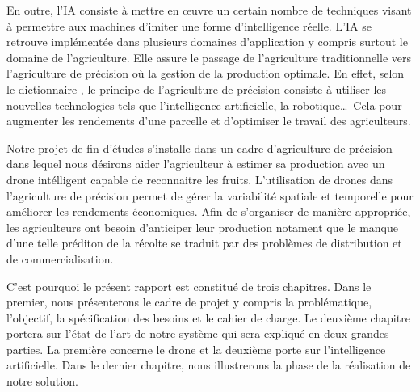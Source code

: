 En outre, l'IA consiste à mettre en œuvre un certain nombre de techniques visant à permettre aux machines d'imiter une forme d'intelligence réelle. L'IA se retrouve implémentée dans plusieurs domaines d'application\cite{netactions} y compris surtout le domaine de l'agriculture. Elle assure le passage de l'agriculture traditionnelle vers l'agriculture de précision où la gestion de la production optimale. En effet, selon le dictionnaire \cite{leshorizons}, le principe de l'agriculture de précision consiste à utiliser les nouvelles technologies tels que l'intelligence artificielle, la robotique\ldots\ Cela pour augmenter les rendements d'une parcelle et d'optimiser le travail des agriculteurs.

Notre projet de fin d'études s'installe dans un cadre d'agriculture de précision dans lequel nous désirons aider l'agriculteur à estimer sa production avec un drone intélligent capable de reconnaitre les fruits. L'utilisation de drones dans l'agriculture de précision permet de gérer la variabilité spatiale et temporelle pour améliorer les rendements économiques. Afin de s'organiser de manière appropriée, les agriculteurs ont besoin d'anticiper leur production notament que le manque d'une telle préditon de la récolte se traduit par des problèmes de distribution et de commercialisation.

C'est pourquoi le présent rapport est constitué de trois chapitres. Dans le premier, nous présenterons le cadre de projet y compris la problématique, l'objectif, la spécification des besoins et le cahier de charge.  Le deuxième chapitre portera sur l'état de l'art de notre système qui sera expliqué en deux grandes parties. La première concerne le drone et la deuxième porte sur l'intelligence artificielle. Dans le dernier chapitre, nous illustrerons la phase de la réalisation de notre solution.